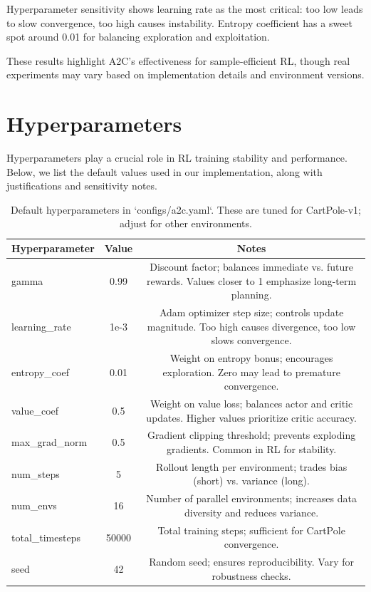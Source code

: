 \documentclass[11pt]{article}
\begin{document}
Hyperparameter sensitivity shows learning rate as the most critical: too low leads to slow convergence, too high causes instability. Entropy coefficient has a sweet spot around 0.01 for balancing exploration and exploitation.

These results highlight A2C's effectiveness for sample-efficient RL, though real experiments may vary based on implementation details and environment versions.
\section{Hyperparameters}
Hyperparameters play a crucial role in RL training stability and performance. Below, we list the default values used in our implementation, along with justifications and sensitivity notes.

\begin{table}[h]
\centering
\begin{tabular}{lcc}
\toprule
Hyperparameter & Value & Notes \\
\midrule
gamma & 0.99 & Discount factor; balances immediate vs. future rewards. Values closer to 1 emphasize long-term planning. \\
learning\_rate & 1e-3 & Adam optimizer step size; controls update magnitude. Too high causes divergence, too low slows convergence. \\
entropy\_coef & 0.01 & Weight on entropy bonus; encourages exploration. Zero may lead to premature convergence. \\
value\_coef & 0.5 & Weight on value loss; balances actor and critic updates. Higher values prioritize critic accuracy. \\
max\_grad\_norm & 0.5 & Gradient clipping threshold; prevents exploding gradients. Common in RL for stability. \\
num\_steps & 5 & Rollout length per environment; trades bias (short) vs. variance (long). \\
num\_envs & 16 & Number of parallel environments; increases data diversity and reduces variance. \\
total\_timesteps & 50000 & Total training steps; sufficient for CartPole convergence. \\
seed & 42 & Random seed; ensures reproducibility. Vary for robustness checks. \\
\bottomrule
\end{tabular}
\caption{Default hyperparameters in `configs/a2c.yaml`. These are tuned for CartPole-v1; adjust for other environments.}
\end{table}
\end{document}
